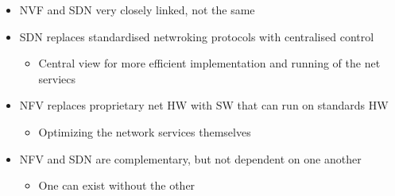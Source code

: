 \begin{itemize}
	\item NVF and SDN very closely linked, not the same
	\item SDN replaces standardised netwroking protocols with centralised
		control
	\begin{itemize}
		\item Central view for more efficient implementation and running
			of the net serviecs
	\end{itemize}
	\item NFV replaces proprietary net HW with SW that can run on standards
		HW
	\begin{itemize}
		\item Optimizing the network services themselves
	\end{itemize}
	\item NFV and SDN are complementary, but not dependent on one
		another
	\begin{itemize}
		\item One can exist without the other
	\end{itemize}
\end{itemize}
